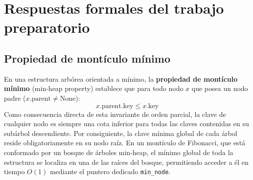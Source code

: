 \section{Respuestas formales del trabajo preparatorio}

\subsection{Propiedad de montículo mínimo}
En una estructura arbórea orientada a mínimo, la \textbf{propiedad de montículo mínimo} (min-heap property) establece que para todo nodo $x$ que posea un nodo padre ($x.\text{parent} \neq \text{None}$):
\begin{equation}
    x.\text{parent}.\text{key} \le x.\text{key}
\end{equation}
Como consecuencia directa de esta invariante de orden parcial, la clave de cualquier nodo es siempre una cota inferior para todas las claves contenidas en su subárbol descendiente. Por consiguiente, la clave mínima global de cada árbol reside obligatoriamente en su nodo raíz. En un montículo de Fibonacci, que está conformado por un bosque de árboles min-heap, el mínimo global de toda la estructura se localiza en una de las raíces del bosque, permitiendo acceder a él en tiempo $O(1)$ mediante el puntero dedicado \texttt{min\_node}.

